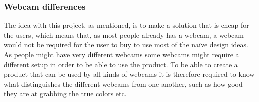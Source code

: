 \subsubsection{Webcam differences}
The idea with this project, as mentioned, is to make a solution that is cheap for the users, which means that, as most people already has a webcam, a webcam would not be required for the user to buy to use most of the naïve design ideas. As people might have very different webcams some webcams might require a different setup in order to be able to use the product. To be able to create a product that can be used by all kinds of webcams it is therefore required to know what distinguishes the different webcams from one another, such as how good they are at grabbing the true colors etc.
